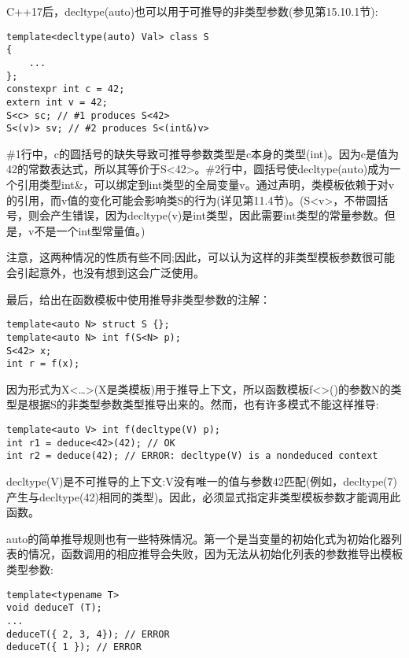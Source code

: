 C++17后，decltype(auto)也可以用于可推导的非类型参数(参见第15.10.1节):

\begin{lstlisting}[style=styleCXX]
template<decltype(auto) Val> class S
{
	...
};
constexpr int c = 42;
extern int v = 42;
S<c> sc; // #1 produces S<42>
S<(v)> sv; // #2 produces S<(int&)v>
\end{lstlisting}

\#1行中，c的圆括号的缺失导致可推导参数类型是c本身的类型(int)。因为c是值为42的常数表达式，所以其等价于S<42>。\#2行中，圆括号使decltype(auto)成为一个引用类型int\&，可以绑定到int类型的全局变量v。通过声明，类模板依赖于对v的引用，而v值的变化可能会影响类S的行为(详见第11.4节)。(S<v>，不带圆括号，则会产生错误，因为decltype(v)是int类型，因此需要int类型的常量参数。但是，v不是一个int型常量值。)

注意，这两种情况的性质有些不同;因此，可以认为这样的非类型模板参数很可能会引起意外，也没有想到这会广泛使用。

最后，给出在函数模板中使用推导非类型参数的注解：

\begin{lstlisting}[style=styleCXX]
template<auto N> struct S {};
template<auto N> int f(S<N> p);
S<42> x;
int r = f(x);
\end{lstlisting}

因为形式为X<…>(X是类模板)用于推导上下文，所以函数模板f<>()的参数N的类型是根据S的非类型参数类型推导出来的。然而，也有许多模式不能这样推导:

\begin{lstlisting}[style=styleCXX]
template<auto V> int f(decltype(V) p);
int r1 = deduce<42>(42); // OK
int r2 = deduce(42); // ERROR: decltype(V) is a nondeduced context
\end{lstlisting}

decltype(V)是不可推导的上下文:V没有唯一的值与参数42匹配(例如，decltype(7)产生与decltype(42)相同的类型)。因此，必须显式指定非类型模板参数才能调用此函数。


auto的简单推导规则也有一些特殊情况。第一个是当变量的初始化式为初始化器列表的情况，函数调用的相应推导会失败，因为无法从初始化列表的参数推导出模板类型参数:

\begin{lstlisting}[style=styleCXX]
template<typename T>
void deduceT (T);
...
deduceT({ 2, 3, 4}); // ERROR
deduceT({ 1 }); // ERROR
\end{lstlisting}


